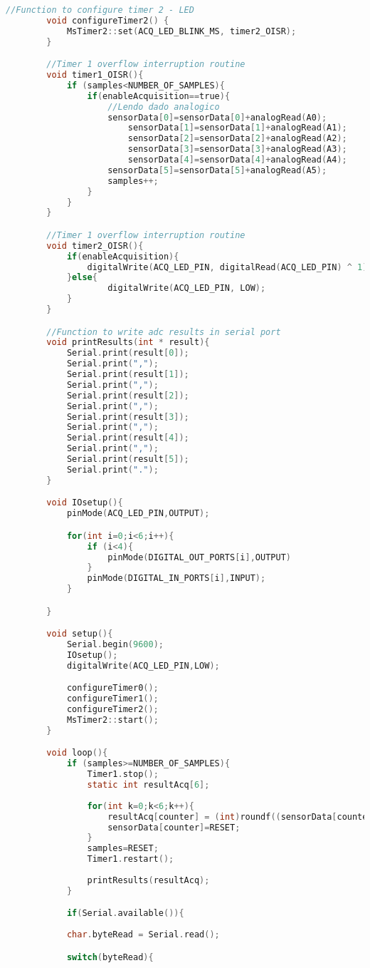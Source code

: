 \begin{lstlisting}[language=C]
		//Function to configure timer 2 - LED
		void configureTimer2() {
			MsTimer2::set(ACQ_LED_BLINK_MS, timer2_OISR); 
		}

		//Timer 1 overflow interruption routine
		void timer1_OISR(){
			if (samples<NUMBER_OF_SAMPLES){
				if(enableAcquisition==true){
					//Lendo dado analogico
					sensorData[0]=sensorData[0]+analogRead(A0);
						sensorData[1]=sensorData[1]+analogRead(A1);
						sensorData[2]=sensorData[2]+analogRead(A2);
						sensorData[3]=sensorData[3]+analogRead(A3);
						sensorData[4]=sensorData[4]+analogRead(A4);
					sensorData[5]=sensorData[5]+analogRead(A5);
					samples++;
				}   
			}
		}

		//Timer 1 overflow interruption routine
		void timer2_OISR(){
			if(enableAcquisition){
				digitalWrite(ACQ_LED_PIN, digitalRead(ACQ_LED_PIN) ^ 1);
			}else{
					digitalWrite(ACQ_LED_PIN, LOW);
			}
		}

		//Function to write adc results in serial port
		void printResults(int * result){    
			Serial.print(result[0]);
			Serial.print(",");
			Serial.print(result[1]);
			Serial.print(",");
			Serial.print(result[2]);
			Serial.print(",");
			Serial.print(result[3]);
			Serial.print(",");
			Serial.print(result[4]);
			Serial.print(",");
			Serial.print(result[5]);
			Serial.print(".");
		}

		void IOsetup(){
			pinMode(ACQ_LED_PIN,OUTPUT);

			for(int i=0;i<6;i++){
				if (i<4){
					pinMode(DIGITAL_OUT_PORTS[i],OUTPUT)
				}
				pinMode(DIGITAL_IN_PORTS[i],INPUT);
			}

		}

		void setup(){
			Serial.begin(9600);
			IOsetup();
			digitalWrite(ACQ_LED_PIN,LOW);

			configureTimer0();
			configureTimer1();
			configureTimer2();
			MsTimer2::start();
		}

		void loop(){
			if (samples>=NUMBER_OF_SAMPLES){
				Timer1.stop();
				static int resultAcq[6];
			
				for(int k=0;k<6;k++){
					resultAcq[counter] = (int)roundf((sensorData[counter]/NUMBER_OF_SAMPLES));
					sensorData[counter]=RESET;
				}
				samples=RESET;
				Timer1.restart();
				
				printResults(resultAcq);
			}

			if(Serial.available()){
			
			char.byteRead = Serial.read();

			switch(byteRead){
				

\end{lstlisting}
